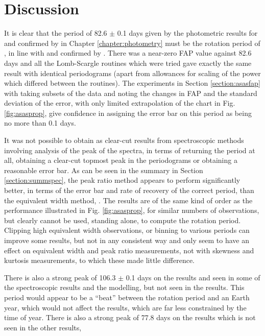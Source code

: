 \chapter{Discussion}
\protect\label{chapter:discussion}

It is clear that the period of 82.6 $\pm$ 0.1 days given by the photometric results for {\asas} and confirmed by {\hst}
in Chapter \ref{chapter:photometry} must be the rotation period of \prox, in line with \citet{benedict98} and confirmed
by \citet{kiraga07}.  There was a near-zero FAP value against 82.6 days and all the Lomb-Scargle routines which were tried gave
exactly the same result with identical periodograms (apart from allowances for scaling of the power which differed
between the routines). The experiments in Section \ref{section:asasfap} with taking subsets of the data and noting the
changes in FAP and the standard deviation of the error, with only limited extrapolation of the chart in
Fig. \ref{fig:asasprop}, give confidence in assigning the error bar on this period as being no more than 0.1 days.

It was not possible to obtain as clear-cut results from spectroscopic methods involving analysis of the {\ha} peak of
the {\prox} spectra, in terms of returning the period at all, obtaining a clear-cut topmost peak in the periodograms or
obtaining a reasonable error bar. As can be seen in the summary in Section \ref{section:summspec}, the peak ratio method
appears to perform significantly better, in terms of the error bar and rate of recovery of the correct period, than the
equivalent width method, . The results are of the same kind of order as the performance illustrated in Fig. \ref{fig:asasprop}, for
similar numbers of observations, but clearly cannot be used, standing alone, to compute the rotation period. Clipping
high equivalent width observations, or binning to various periods can improve some results, but not in any consistent
way and only seem to have an effect on equivalent width and peak ratio measurements, not with skewness and kurtosis
measurements, to which these made little difference.

There is also a strong peak of 106.3 $\pm$ 0.1 days on the {\asas} results and seen in some of the spectroscopic results
and the modelling, but not seen in the {\hst} results. This period would appear to be a ``beat'' between the rotation
period and an Earth year, which would not affect the {\hst} results, which are far less constrained by the time of
year.   There is also a strong peak of 77.8 days on the {\hst} results which is not seen in the
other results, 

